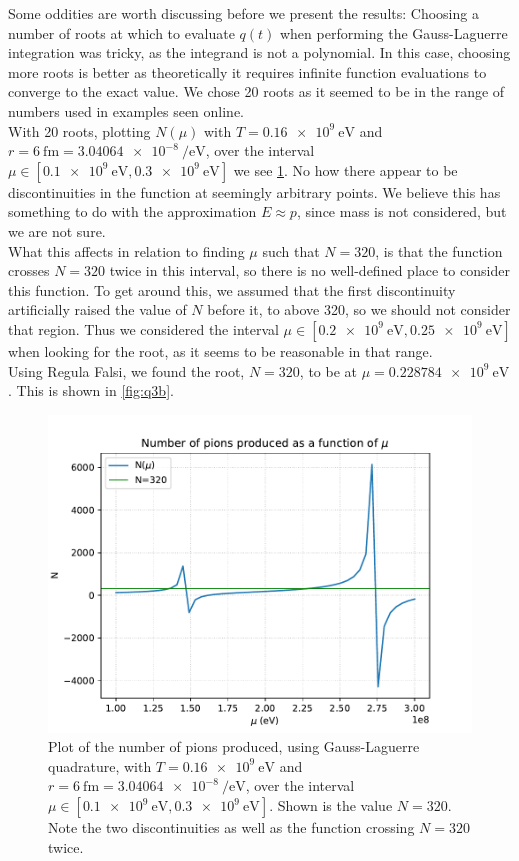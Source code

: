 \documentclass[11pt]{article}
\begin{document}
\begin{enumerate}
    Some oddities are worth discussing before we present the results: Choosing a number of roots at which to evaluate $q(t)$ when performing the Gauss-Laguerre integration was tricky, as the integrand is not a polynomial. In this case, choosing more roots is better as theoretically it requires infinite function evaluations to converge to the exact value. We chose 20 roots as it seemed to be in the range of numbers used in examples seen online.\\
    With 20 roots, plotting $N(\mu)$ with $T=\SI{0.16e9}{\electronvolt}$ and $r=\SI{6}{\femto\metre}=\SI{3.04064e-8}{\per\electronvolt}$, over the interval $\mu\in [\SI{0.1e9}{\electronvolt},\SI{0.3e9}{\electronvolt}]$ we see \cref{fig:q3a}. No how there appear to be discontinuities in the function at seemingly arbitrary points. We believe this has something to do with the approximation $E\approx p$, since mass is not considered, but we are not sure. \\
    What this affects in relation to finding $\mu$ such that $N=320$, is that the function crosses $N=320$ twice in this interval, so there is no well-defined place to consider this function. To get around this, we assumed that the first discontinuity artificially raised the value of $N$ before it, to above 320, so we should not consider that region. Thus we considered the interval $\mu\in [\SI{0.2e9}{\electronvolt}, \SI{0.25e9}{\electronvolt}]$ when looking for the root, as it seems to be reasonable in that range.\\
    
    Using Regula Falsi, we found the root, $N=320$, to be at $\mu=\SI{0.228784e9}{\electronvolt}$. This is shown in \cref{fig:q3b}.

    \begin{figure}[h]
        \begin{center}
            \includegraphics[width=.6\textwidth]{Plots/q3a.pdf}
            \caption{Plot of the number of pions produced, using Gauss-Laguerre quadrature, with $T=\SI{0.16e9}{\electronvolt}$ and $r=\SI{6}{\femto\metre}=\SI{3.04064e-8}{\per\electronvolt}$, over the interval $\mu\in [\SI{0.1e9}{\electronvolt},\SI{0.3e9}{\electronvolt}]$. Shown is the value $N=320$. Note the two discontinuities as well as the function crossing $N=320$ twice.}
            \label{fig:q3a}
        \end{center}
    \end{figure}


\end{enumerate}
\end{document}
